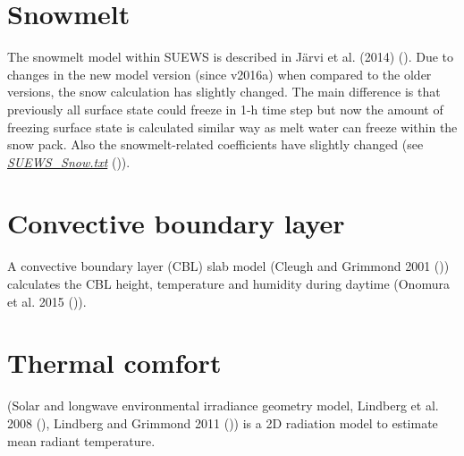 \documentclass[letterpaper,10pt,english]{sphinxmanual}
\begin{document}
\section{Snowmelt}
\label{\detokenize{parameterisations-and-sub-models:snowmelt}}
The snowmelt model within SUEWS is described in Järvi et al.
(2014) \label{\detokenize{parameterisations-and-sub-models:id19}}{\hyperref[\detokenize{references:leena2014}]{\sphinxcrossref{{[}Leena2014{]}}}} (). Due to changes in the new model version (since v2016a)
when compared to the older versions, the snow calculation has slightly
changed. The main difference is that previously all surface state could
freeze in 1-h time step but now the amount of freezing surface state is
calculated similar way as melt water can freeze within the snow pack.
Also the snowmelt-related coefficients have slightly changed (see
{\hyperref[\detokenize{parameterisations-and-sub-models:SUEWS_Snow.txt}]{\emph{SUEWS\_Snow.txt}}} ()).


\section{Convective boundary layer}
\label{\detokenize{parameterisations-and-sub-models:convective-boundary-layer}}
A convective boundary layer (CBL) slab model (Cleugh and Grimmond
2001 \label{\detokenize{parameterisations-and-sub-models:id20}}{\hyperref[\detokenize{references:cg2001}]{\sphinxcrossref{{[}CG2001{]}}}} ()) calculates the CBL height, temperature and humidity during
daytime (Onomura et al. 2015 \label{\detokenize{parameterisations-and-sub-models:id21}}{\hyperref[\detokenize{references:shiho2015}]{\sphinxcrossref{{[}Shiho2015{]}}}} ()).


\section{Thermal comfort}
\label{\detokenize{parameterisations-and-sub-models:thermal-comfort}}
 (Solar and longwave environmental irradiance geometry model,
Lindberg et al. 2008 \label{\detokenize{parameterisations-and-sub-models:id22}}{\hyperref[\detokenize{references:fl2008}]{\sphinxcrossref{{[}FL2008{]}}}} (), Lindberg and Grimmond 2011 \label{\detokenize{parameterisations-and-sub-models:id23}}{\hyperref[\detokenize{references:fl2011}]{\sphinxcrossref{{[}FL2011{]}}}} ()) is a 2D
radiation model to estimate mean radiant temperature.
\end{document}
